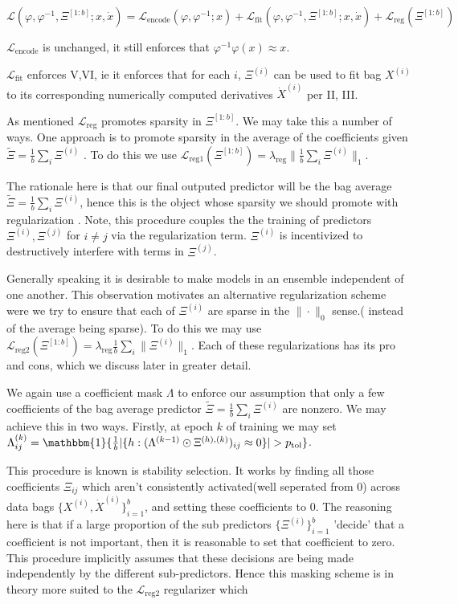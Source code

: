 \documentclass[11pt]{article}
\newcommand{\indi}{\mathbbm{1}}
\newcommand{\norm}[2]{\| #1 \|_{#2}}
\begin{document}
 $\mathcal{L}(\varphi, \varphi^{-1}, \Xi^{[1:b]} ; x ,\dot{x}) = \mathcal{L}_\text{encode}(\varphi, \varphi^{-1}; x) + \mathcal{L}_\text{fit}(\varphi, \varphi^{-1},\Xi^{[1:b]}; x,\dot{x}) + \mathcal{L}_\text{reg}(\Xi^{[1:b]})$
 
  $\mathcal{L}_\text{encode}$ is unchanged,  it still enforces that $\varphi^{-1} \varphi(x) \approx  x$. 
  
 $\mathcal{L}_\text{fit}$ enforces  V,VI, ie it enforces that for each $i$,   $\Xi^{(i)}$ can be used to fit bag $X^{(i)}$ to its corresponding numerically computed derivatives $\dot{X}^{(i)}$ per II, III.
  
  
   As mentioned $\mathcal{L}_\text{reg}$ promotes sparsity in $\Xi^{[1:b]}$. We may take this a number of ways.  One approach  is to promote sparsity in the   average of the coefficients  given $\tilde{\Xi} = \frac{1}{b}\sum_{i} \Xi^{(i)}$ .  To do this we use $\mathcal{L}_\text{reg1}(\Xi^{[1:b]}) = \lambda_\text{reg}\norm{\frac{1}{b}\sum_{i} \Xi^{(i)}}{1}$.  
   
   The rationale here is that our final outputed predictor will be the bag average 
   $\tilde{\Xi} = \frac{1} {b}\sum_{i} \Xi^{(i)}$,  hence this is the object whose sparsity we should promote with regularization .  
   Note, this procedure couples the the training of predictors $\Xi^{(i)},  \Xi^{(j)}$ for $i \neq j$ via the regularization term.  $\Xi^{(i)}$ is incentivized to destructively interfere with  terms in $\Xi^{(j)}$.  
   
   Generally speaking it is desirable to make models in an 
   ensemble independent of one another.   This observation motivates an alternative regularization scheme were we try to ensure that each of $\Xi^{(i)}$ are sparse in the $\norm{\cdot}{0}$ sense.( instead of the average being sparse).  To do this we may use 
 $\mathcal{L}_\text{reg2}(\Xi^{[1:b]}) = \lambda_\text{reg} 
\frac{1}{b} \sum_{i}\norm{\Xi^{(i)}}{1}$. 
Each of these regularizations  has its pro and cons,  which we discuss later in greater detail.
 
 We again use a coefficient mask $\Lambda$ to enforce our  assumption that only a few coefficients of the bag average predictor $\tilde{\Xi}  = \frac{1}{b}\sum_{i} \Xi^{(i)}$ are nonzero.  We may achieve this in two ways.
Firstly,  at epoch $k$ of training we may set $\Lambda ^{(k)}_{ij} = \indi\{\frac{1}{b}
  | \{h : (\Lambda ^{(k-1)}\odot \Xi^{(h),(k)})_{ij} \approx 0\}| > p_\text{tol} \}$.
  
  This procedure is known is stability selection.  It works by finding  all those coefficients $\Xi_{ij}$ which aren't consistently activated(well seperated from 0) across data bags $\{X^{(i)},  \dot{X}^{(i)}\}_{i=1}^b$,   and setting these coefficients to $0$.   The reasoning here is that if a large proportion of the sub predictors $\{\Xi^{(i)}\}_{i=1}^{b}$ 'decide' that a coefficient is not important,  then it is reasonable to set that coefficient to zero.  This procedure implicitly assumes that these decisions  are being made independently by the different sub-predictors.  Hence this masking scheme is in theory more suited to the $\mathcal{L}_\text{reg2}$ regularizer  which 
  
\end{document}
